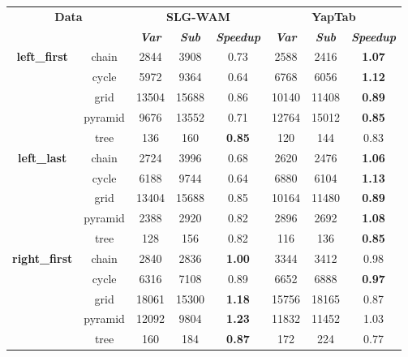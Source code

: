 \begin{table}[ht]
\centering
\footnotesize{
  \begin{tabular}{cc|ccc|ccc}
   \hline
    \hline
    \multicolumn{2}{c|}{\multirow{2}{*}{\small{\textbf{Data}}}} & \multicolumn{3}{c|}{\small{\textbf{SLG-WAM}}} & \multicolumn{3}{c}{\small{\textbf{YapTab}}} \\
     \multicolumn{2}{c|}{} & \textbf{\textit{Var}} & \textbf{\textit{Sub}} & \textbf{\textit{Speedup}} & \textbf{\textit{Var}} & \textbf{\textit{Sub}} & \textbf{\textit{Speedup}} \\
   \hline
   \hline
   \multirow{5}{*}{\textbf{left\_first}} &  \scriptsize{chain}  &  2844 & 3908 &  0.73  & 2588 & 2416 &  \textbf{1.07} \\
   &  \scriptsize{cycle}  &  5972 & 9364 &  0.64  & 6768 & 6056 &  \textbf{1.12} \\
   &  \scriptsize{grid}  &  13504 & 15688 &  0.86  & 10140 & 11408 &  \textbf{0.89} \\
   &  \scriptsize{pyramid}  &  9676 & 13552 &  0.71  & 12764 & 15012 &  \textbf{0.85} \\
   &  \scriptsize{tree}  &  136 & 160 &  \textbf{0.85}  & 120 & 144 &  0.83 \\
   \hline
   \multirow{5}{*}{\textbf{left\_last}} &  \scriptsize{chain}  &  2724 & 3996 &  0.68  & 2620 & 2476 &  \textbf{1.06} \\
   &  \scriptsize{cycle}  &  6188 & 9744 &  0.64  & 6880 & 6104 &  \textbf{1.13} \\
   &  \scriptsize{grid}  &  13404 & 15688 &  0.85  & 10164 & 11480 &  \textbf{0.89} \\
   &  \scriptsize{pyramid}  &  2388 & 2920 &  0.82  & 2896 & 2692 &  \textbf{1.08} \\
   &  \scriptsize{tree}  &  128 & 156 &  0.82  & 116 & 136 &  \textbf{0.85} \\
   \hline
   \multirow{5}{*}{\textbf{right\_first}} &  \scriptsize{chain}  &  2840 & 2836 &  \textbf{1.00}  & 3344 & 3412 &  0.98 \\
   &  \scriptsize{cycle}  &  6316 & 7108 &  0.89  & 6652 & 6888 &  \textbf{0.97} \\
   &  \scriptsize{grid}  &  18061 & 15300 &  \textbf{1.18}  & 15756 & 18165 &  0.87 \\
   &  \scriptsize{pyramid}  &  12092 & 9804 &  \textbf{1.23}  & 11832 & 11452 &  1.03 \\
   &  \scriptsize{tree}  &  160 & 184 &  \textbf{0.87}  & 172 & 224 &  0.77 \\

\end{tabular}}
\end{table}
